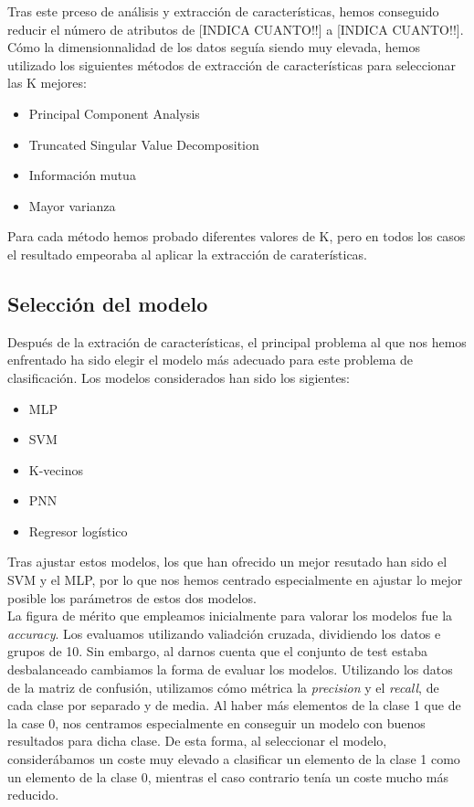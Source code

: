 \documentclass[journal,twoside]{JoPhA}
\begin{document}

Tras este prceso de análisis y extracción de características, hemos conseguido reducir el número de atributos de [INDICA CUANTO!!] a [INDICA CUANTO!!]. \\

Cómo la dimensionnalidad de los datos seguía siendo muy elevada, hemos utilizado los siguientes métodos de extracción de características para seleccionar las K mejores: \\

\begin{itemize}
	\item Principal Component Analysis
	\item Truncated Singular Value Decomposition
	\item Información mutua
	\item Mayor varianza
\end{itemize}

Para cada método hemos probado diferentes valores de K, pero en todos los casos el resultado empeoraba al aplicar la extracción de caraterísticas. \\

\subsection{Selección del modelo}
Después de la extración de características, el principal problema al que nos hemos enfrentado ha sido elegir el modelo más adecuado para este problema de clasificación. Los modelos considerados han sido los sigientes: \\

\begin{itemize}
	\item MLP
	\item SVM
	\item K-vecinos
	\item PNN
	\item Regresor logístico
\end{itemize} 

Tras ajustar estos modelos, los que han ofrecido un mejor resutado han sido el SVM y el MLP, por lo que nos hemos centrado especialmente en ajustar lo mejor posible los parámetros de estos dos modelos. \\

La figura de mérito que empleamos inicialmente para valorar los modelos fue la \textit{accuracy}. Los evaluamos utilizando valiadción cruzada, dividiendo los datos e grupos de 10. Sin embargo, al darnos cuenta que el conjunto de test estaba desbalanceado cambiamos la forma de evaluar los modelos. Utilizando los datos de la matriz de confusión, utilizamos cómo métrica la \textit{precision} y el \textit{recall}, de cada clase por separado y de media. Al haber más elementos de la clase 1 que de la case 0, nos centramos especialmente en conseguir un modelo con buenos resultados para dicha clase. De esta forma, al seleccionar el modelo, considerábamos un coste muy elevado a clasificar un elemento de la clase 1 como un elemento de la clase 0, mientras el caso contrario tenía un coste mucho más reducido.
\end{document}
